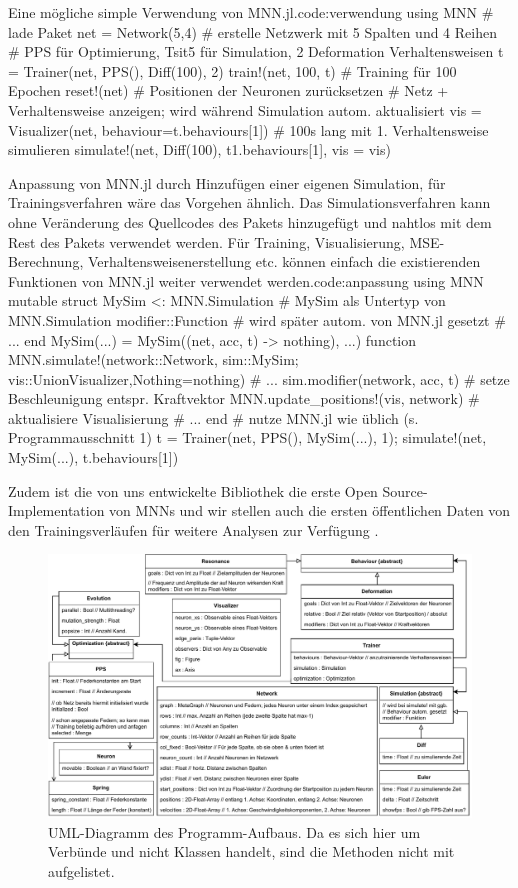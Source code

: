 \documentclass[10pt]{scrartcl}
\begin{document}
\begin{code}[1]{Eine mögliche simple Verwendung von MNN.jl.}{code:verwendung}
using MNN # lade Paket
net = Network(5,4) # erstelle Netzwerk mit 5 Spalten und 4 Reihen
# PPS für Optimierung, Tsit5 für Simulation, 2 Deformation Verhaltensweisen
t = Trainer(net, PPS(), Diff(100), 2)
train!(net, 100, t) # Training für 100 Epochen
reset!(net) # Positionen der Neuronen zurücksetzen
# Netz + Verhaltensweise anzeigen; wird während Simulation autom. aktualisiert
vis = Visualizer(net, behaviour=t.behaviours[1])
# 100s lang mit 1. Verhaltensweise simulieren
simulate!(net, Diff(100), t1.behaviours[1], vis = vis)
\end{code}

\begin{code}[1]{Anpassung von MNN.jl durch Hinzufügen einer eigenen Simulation, für Trainingsverfahren wäre das Vorgehen ähnlich.
Das Simulationsverfahren kann ohne Veränderung des Quellcodes des Pakets hinzugefügt und nahtlos mit dem Rest des Pakets verwendet werden.
Für Training, Visualisierung, MSE-Berechnung, Verhaltensweisenerstellung etc. können einfach die existierenden Funktionen von MNN.jl weiter verwendet werden.}{code:anpassung}
using MNN
mutable struct MySim <: MNN.Simulation # MySim als Untertyp von MNN.Simulation
    modifier::Function # wird später autom. von MNN.jl gesetzt
    # ...
end 
MySim(...) = MySim((net, acc, t) -> nothing), ...)
function MNN.simulate!(network::Network, sim::MySim; vis::Union{Visualizer,Nothing}=nothing)
    # ...
    sim.modifier(network, acc, t) # setze Beschleunigung entspr. Kraftvektor
    MNN.update_positions!(vis, network) # aktualisiere Visualisierung
    # ...
end
# nutze MNN.jl wie üblich (s. Programmausschnitt 1)
t = Trainer(net, PPS(), MySim(...), 1); simulate!(net, MySim(...), t.behaviours[1])
\end{code}

Zudem ist die von uns entwickelte Bibliothek die erste Open Source-Implementation von MNNs und wir stellen auch die ersten öffentlichen Daten von den Trainingsverläufen für weitere Analysen zur Verfügung \cite{RepoMNN}.

\newpage
\clearpage
\FloatBarrier
\begin{figure}[H]
    \centering
    \includegraphics[width=\textwidth]{bilder/UML.pdf}
    \caption{UML-Diagramm des Programm-Aufbaus. Da es sich hier um Verbünde und nicht Klassen handelt, sind die Methoden nicht mit aufgelistet.}
    \label{fig:uml}
\end{figure}
\end{document}
